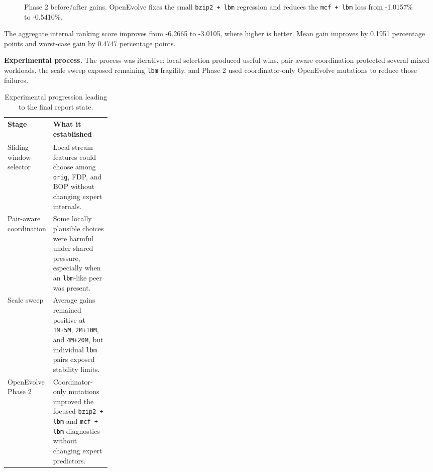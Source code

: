 \documentclass[10pt,letterpaper]{article}
\newcommand{\pct}[1]{#1\%}
\newcommand{\code}[1]{\texttt{#1}}
\begin{document}
\begin{figure}[!htbp]
\centering
{}
\caption{Phase 2 before/after gains. OpenEvolve fixes the small \code{bzip2 + lbm} regression and reduces the \code{mcf + lbm} loss from \pct{-1.0157} to \pct{-0.5410}.}
\label{fig:phase2gains}
\end{figure}

The aggregate internal ranking score improves from -6.2665 to -3.0105, where
higher is better. Mean gain improves by 0.1951 percentage points and worst-case
gain by 0.4747 percentage points.

\noindent\textbf{Experimental process.}
The process was iterative: local selection produced useful wins, pair-aware
coordination protected several mixed workloads, the scale sweep exposed
remaining \code{lbm} fragility, and Phase 2 used coordinator-only OpenEvolve
mutations to reduce those failures.

\begin{table}[!htbp]
\centering
\scriptsize
\caption{Experimental progression leading to the final report state.}
\label{tab:process}
\begin{tabularx}{\linewidth}{@{}p{0.24\linewidth}X@{}}
\toprule
Stage & What it established \\
\midrule
Sliding-window selector & Local stream features could choose among \code{orig}, FDP, and BOP without changing expert internals. \\
Pair-aware coordination & Some locally plausible choices were harmful under shared pressure, especially when an \code{lbm}-like peer was present. \\
Scale sweep & Average gains remained positive at \code{1M+5M}, \code{2M+10M}, and \code{4M+20M}, but individual \code{lbm} pairs exposed stability limits. \\
OpenEvolve Phase 2 & Coordinator-only mutations improved the focused \code{bzip2 + lbm} and \code{mcf + lbm} diagnostics without changing expert predictors. \\
\bottomrule
\end{tabularx}
\end{table}
\end{document}
